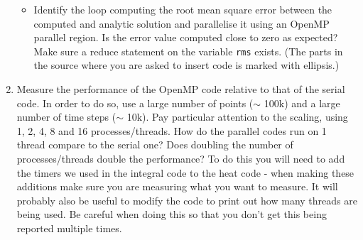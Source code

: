 \documentclass[a4paper, 12pt]{article}
\def \cc   {\tt }               %
\begin{document}
\begin{enumerate}
\begin{itemize}
      \item Identify the loop computing the root mean square error
        between the computed and analytic solution and parallelise it
        using an OpenMP parallel region.  Is the error value computed
        close to zero as expected?  Make sure a reduce statement on
        the variable {\cc rms} exists.  (The parts in the source where
        you are asked to insert code is marked with ellipsis.)
    \end{itemize}


  \item Measure the performance of the OpenMP code
    relative to that of the serial code.  In order to do so, use a
    large number of points ($\sim$ 100k) and a large number of time
    steps ($\sim$ 10k).  Pay particular attention to the scaling,
    using 1, 2, 4, 8 and 16 processes/threads.  How do the parallel
    codes run on 1 thread compare to the serial one?  Does doubling
    the number of processes/threads double the performance? To do this 
    you will need to add the timers we used in the integral code to
    the heat code - when making these additions make sure you are measuring 
    what you want to measure. It will probably also be useful to modify
    the code to print out how many threads are being used.
    Be careful when doing this so that you don't get this being reported 
    multiple times.

\end{enumerate}

\end{document}
